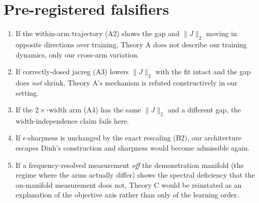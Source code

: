 \documentclass[10pt]{article}
\begin{document}
\section{Pre-registered falsifiers}
\begin{enumerate}\itemsep2pt
\item If the within-arm trajectory (A2) shows the gap and $\|J\|_2$ moving
in opposite directions over training, Theory A does not describe our
training dynamics, only our cross-arm variation.
\item If correctly-dosed jacreg (A3) lowers $\|J\|_2$ with the fit intact
and the gap does \emph{not} shrink, Theory A's mechanism is refuted
constructively in our setting.
\item If the $2\times$-width arm (A4) has the same $\|J\|_2$ and a
different gap, the width-independence claim fails here.
\item If $\epsilon$-sharpness is unchanged by the exact rescaling (B2),
our architecture escapes Dinh's construction and sharpness would become
admissible again.
\item If a frequency-resolved measurement \emph{off} the demonstration
manifold (the regime where the arms actually differ) shows the spectral
deficiency that the on-manifold measurement does not, Theory C would be
reinstated as an explanation of the objective axis rather than only of
the learning order.
\end{enumerate}
\end{document}

